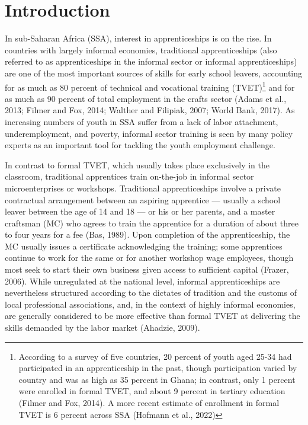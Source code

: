 \documentclass[
  11pt,
a4paper
]{article}
\begin{document}
\tableofcontents
\listoffigures
\listoftables
\newpage

\doublespacing

\hypertarget{intro}{%
\section{Introduction}\label{intro}}

In sub-Saharan Africa (SSA), interest in apprenticeships is on the rise. In countries with largely informal economies, traditional apprenticeships (also referred to as apprenticeships in the informal sector or informal apprenticeships) are one of the most important sources of skills for early school leavers, accounting for as much as 80 percent of technical and vocational training (TVET)\footnote{According to a survey of five countries, 20 percent of youth aged 25-34 had participated in an apprenticeship in the past, though participation varied by country and was as high as 35 percent in Ghana; in contrast, only 1 percent were enrolled in formal TVET, and about 9 percent in tertiary education (Filmer and Fox, 2014). A more recent estimate of enrollment in formal TVET is 6 percent across SSA (Hofmann et al., 2022)} and for as much as 90 percent of total employment in the crafts sector (Adams et al., 2013; Filmer and Fox, 2014; Walther and Filipiak, 2007; World Bank, 2017). As increasing numbers of youth in SSA suffer from a lack of labor attachment, underemployment, and poverty, informal sector training is seen by many policy experts as an important tool for tackling the youth employment challenge.

In contrast to formal TVET, which usually takes place exclusively in the classroom, traditional apprentices train on-the-job in informal sector microenterprises or workshops. Traditional apprenticeships involve a private contractual arrangement between an aspiring apprentice --- usually a school leaver between the age of 14 and 18 --- or his or her parents, and a master craftsman (MC) who agrees to train the apprentice for a duration of about three to four years for a fee (Bas, 1989). Upon completion of the apprenticeship, the MC usually issues a certificate acknowledging the training; some apprentices continue to work for the same or for another workshop wage employees, though most seek to start their own business given access to sufficient capital (Frazer, 2006). While unregulated at the national level, informal apprenticeships are nevertheless structured according to the dictates of tradition and the customs of local professional associations, and, in the context of highly informal economies, are generally considered to be more effective than formal TVET at delivering the skills demanded by the labor market (Ahadzie, 2009).
\end{document}
